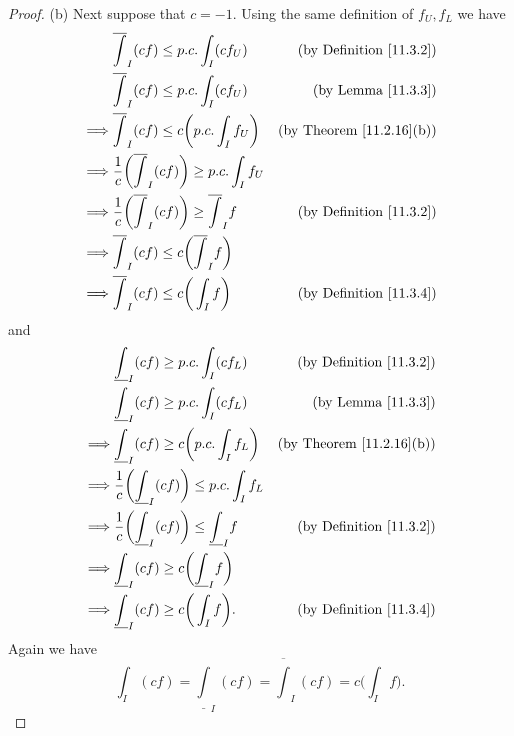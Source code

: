 \begin{proof}{(b)}
    Next suppose that \(c = -1\).
    Using the same definition of \(f_U, f_L\) we have
    \begin{align*}
                 & \overline{\int}_I (cf) \leq p.c. \int_I (c f_U)                         & \text{(by Definition \ref{11.3.2})}  \\
                 & \overline{\int}_I (cf) \leq p.c. \int_I (c f_U)                         & \text{(by Lemma \ref{11.3.3})}       \\
        \implies & \overline{\int}_I (cf) \leq c \bigg(p.c. \int_I f_U\bigg)               & \text{(by Theorem \ref{11.2.16}(b))} \\
        \implies & \frac{1}{c} \bigg(\overline{\int}_I (cf)\bigg) \geq p.c. \int_I f_U                                            \\
        \implies & \frac{1}{c} \bigg(\overline{\int}_I (cf)\bigg) \geq \overline{\int}_I f & \text{(by Definition \ref{11.3.2})}  \\
        \implies & \overline{\int}_I (cf) \leq c\bigg(\overline{\int}_I f\bigg)                                                   \\
        \implies & \overline{\int}_I (cf) \leq c\bigg(\int_I f\bigg)                       & \text{(by Definition \ref{11.3.4})}
    \end{align*}
    and
    \begin{align*}
                 & \underline{\int}_I (cf) \geq p.c. \int_I (c f_L)                          & \text{(by Definition \ref{11.3.2})}  \\
                 & \underline{\int}_I (cf) \geq p.c. \int_I (c f_L)                          & \text{(by Lemma \ref{11.3.3})}       \\
        \implies & \underline{\int}_I (cf) \geq c \bigg(p.c. \int_I f_L\bigg)                & \text{(by Theorem \ref{11.2.16}(b))} \\
        \implies & \frac{1}{c} \bigg(\underline{\int}_I (cf)\bigg) \leq p.c. \int_I f_L                                             \\
        \implies & \frac{1}{c} \bigg(\underline{\int}_I (cf)\bigg) \leq \underline{\int}_I f & \text{(by Definition \ref{11.3.2})}  \\
        \implies & \underline{\int}_I (cf) \geq c\bigg(\underline{\int}_I f\bigg)                                                   \\
        \implies & \underline{\int}_I (cf) \geq c\bigg(\int_I f\bigg).                       & \text{(by Definition \ref{11.3.4})}
    \end{align*}
    Again we have
    \[
        \int_I (cf) = \underline{\int}_I (cf) = \overline{\int}_I (cf) = c\bigg(\int_I f\bigg).
    \]


\end{proof}
